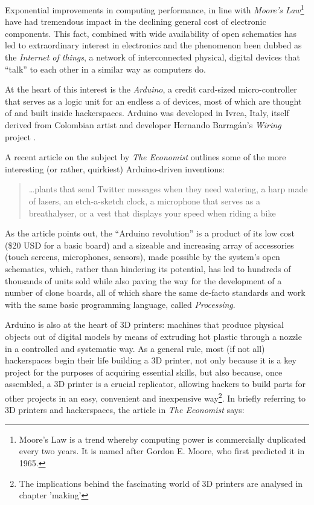 Exponential improvements in computing performance, in line with \textit{Moore's Law}\footnote{Moore's Law is a trend whereby computing power is commercially duplicated every two years. It is named after Gordon E. Moore, who first predicted it in 1965.} have had tremendous impact in the declining general cost of electronic components. This fact, combined with wide availability of open schematics has led to extraordinary interest in electronics and the phenomenon been dubbed as the \textit{Internet of things}, a network of interconnected physical, digital devices that ``talk'' to each other in a similar way as computers do.

At the heart of this interest is the \textit{Arduino}, a credit card-sized micro-controller that serves as a logic unit for an endless a of devices, most of which are thought of and built inside hackerspaces. Arduino was developed in Ivrea, Italy, itself derived from Colombian artist and developer Hernando Barrag\'{a}n's \textit{Wiring} project \citep{reas10}.

A recent article on the subject by \textit{The Economist} \citeyearpar{economist12} outlines some of the more interesting (or rather, quirkiest) Arduino-driven inventions:

\begin{quote}
\ldots plants that send Twitter messages when they need watering, a harp made of lasers, an etch-a-sketch clock, a microphone that serves as a breathalyser, or a vest that displays your speed when riding a bike
\end{quote}

As the article points out, the ``Arduino revolution'' is a product of its low cost (\$20 USD for a basic board) and a sizeable and increasing array of accessories (touch screens, microphones, sensors), made possible by the system's open schematics, which, rather than hindering its potential, has led to hundreds of thousands of units sold \citep{economist12} while also paving the way for the development of a number of clone boards, all of which share the same de-facto standards and work with the same basic programming language, called \textit{Processing}.

Arduino is also at the heart of 3D printers: machines that produce physical objects out of digital models by means of extruding hot plastic through a nozzle in a controlled and systematic way. As a general rule, most (if not all) hackerspaces begin their life building a 3D printer, not only because it is a key project for the purposes of acquiring essential skills, but also because, once assembled, a 3D printer is a crucial replicator, allowing hackers to build parts for other projects in an easy, convenient and inexpensive way\footnote{The implications behind the fascinating world of 3D printers are analysed in chapter 'making'}. In briefly referring to 3D printers and hackerspaces, the article in \textit{The Economist} says:

